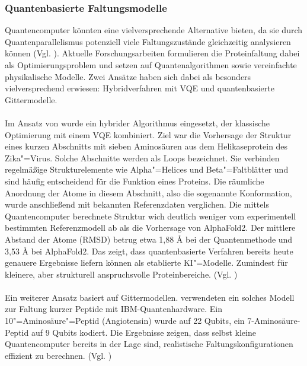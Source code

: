 \subsubsection*{Quantenbasierte Faltungsmodelle}
Quantencomputer könnten eine vielversprechende Alternative bieten, da sie durch Quantenparallelismus potenziell viele Faltungszustände gleichzeitig analysieren können (Vgl. \cite{doga_perspective_2024}). Aktuelle Forschungsarbeiten formulieren die Proteinfaltung dabei als Optimierungsproblem und setzen auf Quantenalgorithmen sowie vereinfachte physikalische Modelle. Zwei Ansätze haben sich dabei als besonders vielversprechend erwiesen: Hybridverfahren mit VQE und quantenbasierte Gittermodelle.\\
\\
Im Ansatz von \citeauthor{doga_perspective_2024} wurde ein hybrider Algorithmus eingesetzt, der klassische Optimierung mit einem VQE kombiniert. Ziel war die Vorhersage der Struktur eines kurzen Abschnitts mit sieben Aminosäuren aus dem Helikaseprotein des Zika"=Virus. Solche Abschnitte werden als Loops bezeichnet. Sie verbinden regelmäßige Strukturelemente wie Alpha"=Helices und Beta"=Faltblätter und sind häufig entscheidend für die Funktion eines Proteins. Die räumliche Anordnung der Atome in diesem Abschnitt, also die sogenannte Konformation, wurde anschließend mit bekannten Referenzdaten verglichen. Die mittels Quantencomputer berechnete Struktur wich deutlich weniger vom experimentell bestimmten Referenzmodell ab als die Vorhersage von AlphaFold2. Der mittlere Abstand der Atome (RMSD) betrug etwa 1,88 Å bei der Quantenmethode und 3,53 Å bei AlphaFold2. Das zeigt, dass quantenbasierte Verfahren bereits heute genauere Ergebnisse liefern können als etablierte KI"=Modelle. Zumindest für kleinere, aber strukturell anspruchsvolle Proteinbereiche. (Vgl. \cite{doga_perspective_2024})\\
\\
Ein weiterer Ansatz basiert auf Gittermodellen. \citeauthor{robert_resource-efficient_2021} verwendeten ein solches Modell zur Faltung kurzer Peptide mit IBM-Quantenhardware. Ein 10"=Aminosäure"=Peptid (Angiotensin) wurde auf 22 Qubits, ein 7-Aminosäure-Peptid auf 9 Qubits kodiert. Die Ergebnisse zeigen, dass selbst kleine Quantencomputer bereits in der Lage sind, realistische Faltungskonfigurationen effizient zu berechnen. (Vgl. \cite{robert_resource-efficient_2021})



